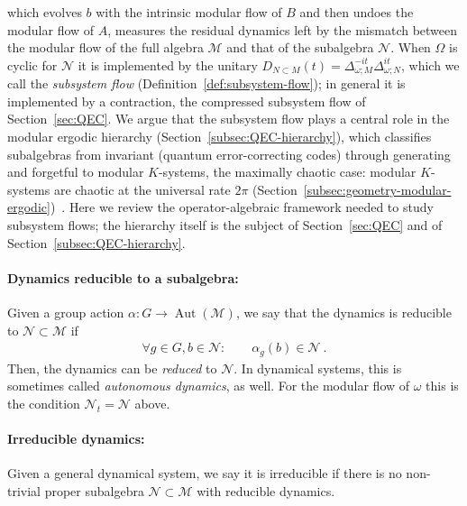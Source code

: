 \documentclass[a4paper,11pt]{article}
\theoremstyle{definition}
\begin{document}
which evolves $b$ with the intrinsic modular flow of $B$ and then undoes the modular flow of $A$, measures the residual dynamics left by the mismatch between the modular flow of the full algebra $\mathcal M$ and that of the subalgebra $\mathcal N$. When $\Omega$ is cyclic for $\mathcal N$ it is implemented by the unitary $D_{N\subset M}(t)=\Delta_{\omega;M}^{-it}\Delta_{\omega;N}^{it}$, which we call the \emph{subsystem flow} (Definition~\ref{def:subsystem-flow}); in general it is implemented by a contraction, the compressed subsystem flow of Section~\ref{sec:QEC}. We argue that the subsystem flow plays a central role in the modular ergodic hierarchy (Section~\ref{subsec:QEC-hierarchy}), which classifies subalgebras from invariant (quantum error-correcting codes) through generating and forgetful to modular $K$-systems, the maximally chaotic case: modular $K$-systems are chaotic at the universal rate $2\pi$ (Section~\ref{subsec:geometry-modular-ergodic})~\cite{OFLLM2024}.
Here we review the operator-algebraic framework needed to study subsystem flows; the hierarchy itself is the subject of Section~\ref{sec:QEC} and of Section~\ref{subsec:QEC-hierarchy}.

\paragraph{Dynamics reducible to a subalgebra:} Given a group action $\alpha:G\to\operatorname{Aut}(\mathcal M)$, we say that the dynamics is reducible to $\mathcal N\subset\mathcal M$ if 
\begin{align}
    \forall g\in G,b\in\mathcal N:\qquad \alpha_g(b)\in \mathcal N\ . 
\end{align}
Then, the dynamics can be {\it reduced} to $\mathcal N$. In dynamical systems, this is sometimes called {\it autonomous dynamics}, as well. For the modular flow of $\omega$ this is the condition $\mathcal N_t=\mathcal N$ above.

\paragraph{Irreducible dynamics:} Given a general dynamical system, we say it is irreducible if there is no non-trivial proper subalgebra $\mathcal N\subset \mathcal M$ with reducible dynamics.
\end{document}
